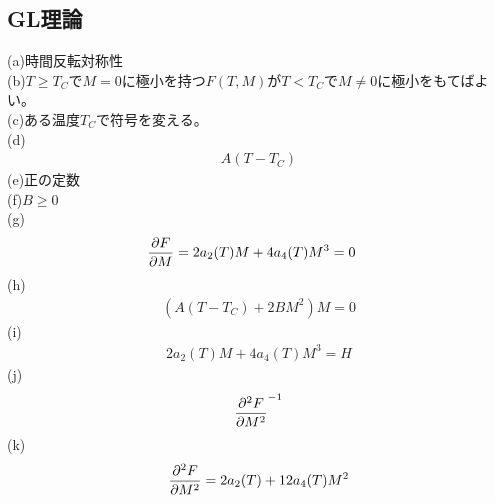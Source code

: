 \documentclass[a4paper,11pt]{jsarticle}
\numberwithin{equation}{section}
\begin{document}
\subsection{GL理論}
\noindent
(a)時間反転対称性\\
(b)$T \geq T_C$で$M=0$に極小を持つ$F(T,M)$が$T < T_C$で$M\neq 0$に極小をもてばよい。\\
(c)ある温度$T_C$で符号を変える。\\
(d)
\begin{align}
  A(T-T_C)
\end{align}
(e)正の定数\\
(f)$B \geq 0$\\
(g)
\begin{align}
  \pdv{F}{M} &= 2a_2(T)M + 4a_4(T)M^3=0
\end{align}
(h)
\begin{align}
  (A(T-T_C) + 2BM^2)M=0
\end{align}
(i)
\begin{align}
  2a_2(T)M + 4a_4(T)M^3 = H
\end{align}
(j)
\begin{align}
  \pdv[2]{F}{M}^{-1}
\end{align}
(k)
\begin{align}
  \pdv[2]{F}{M} = 2a_2(T) + 12a_4(T)M^2
\end{align}
\end{document}

